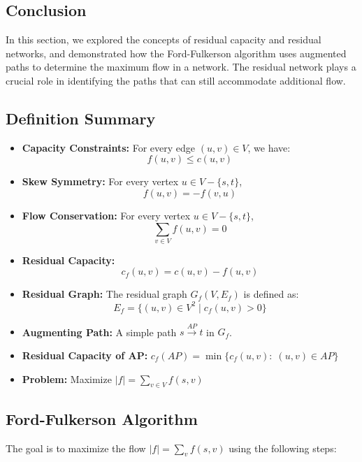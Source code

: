 \subsection{Conclusion}
\begin{summary}
    In this section, we explored the concepts of residual capacity and residual networks, and demonstrated how the Ford-Fulkerson algorithm uses augmented paths to determine the maximum flow in a network. The residual network plays a crucial role in identifying the paths that can still accommodate additional flow.
\end{summary}

\subsection{Definition Summary}
\begin{summary}
    \begin{itemize}
        \item \textbf{Capacity Constraints:} For every edge $(u, v) \in V$, we have:
        \[
        f(u, v) \leq c(u, v)
        \]
        \item \textbf{Skew Symmetry:} For every vertex $u \in V - \{s, t\}$,
        \[
        f(u, v) = -f(v, u)
        \]
        \item \textbf{Flow Conservation:} For every vertex $u \in V - \{s, t\}$,
        \[
        \sum_{v \in V} f(u, v) = 0
        \]
        \item \textbf{Residual Capacity:}
        \[
        c_f(u, v) = c(u, v) - f(u, v)
        \]
        \item \textbf{Residual Graph:} The residual graph $G_f(V, E_f)$ is defined as:
        \[
        E_f = \{(u, v) \in V^2 \mid c_f(u, v) > 0\}
        \]
        \item \textbf{Augmenting Path:} A simple path $s \overset{AP}{\rightarrow} t$ in $G_f$.
        \item \textbf{Residual Capacity of AP:} $c_f (AP) = \min \{c_f(u,v): \; (u,v) \in AP\}$
        \item \textbf{Problem:} Maximize $|f| = \sum_{v \in V} f(s,v)$
    \end{itemize}
\end{summary}

\subsection{Ford-Fulkerson Algorithm}
\begin{algo}
    The goal is to maximize the flow $|f| = \sum_{v} f(s, v)$ using the following steps:

\end{algo}

